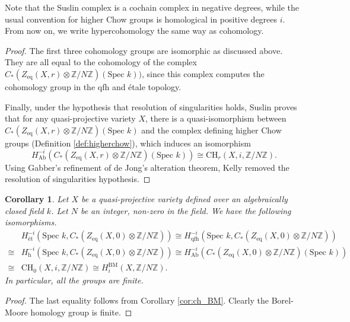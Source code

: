 \documentclass{amsart}
\newtheorem{cor}[theorem]{Corollary}
\theoremstyle{definition}
\theoremstyle{remark}
\newcommand{\mbb}{\mathbb}
\newcommand{\ZZ}{\mbb{Z}}
\newcommand{\SP}{\text{Spec }}
\newcommand{\eq}{\text{eq}}
\begin{document}
Note that the Suslin complex is a cochain complex in negative degrees, while the usual convention for higher Chow groups is homological in positive degrees $i$. 
From now on, we write hypercohomology the same way as cohomology.
\begin{proof}
The first three cohomology groups are isomorphic as discussed above. They are all equal to the cohomology of the complex $C_*(Z_\eq(X, r)\otimes \ZZ/N \ZZ)(\SP k))$, since this complex computes the cohomology group in the qfh and \'etale topology.

Finally,  under the hypothesis that resolution of singularities holds, Suslin \cite[Theorem 3.2]{Suslin_Higher_Chow} proves that for any quasi-projective variety $X$, there is a quasi-isomorphism between 
$C_*(Z_\eq(X, r)\otimes \ZZ/N \ZZ)(\SP k)$ and the complex defining higher Chow groups (Definition \ref{def:higherchow}), which induces
an isomorphism
\[
H^{-i}_\text{Ab}(C_*(Z_\eq(X, r)\otimes \ZZ/N \ZZ)(\SP k))
\cong \text{CH}_{r}(X, i, \ZZ/N \ZZ).
\]
Using Gabber's refinement of de Jong's alteration theorem, Kelly \cite[Theorem 5.6.4]{Kelly} removed the resolution of singularities hypothesis.
\end{proof}


\begin{cor}\label{cor:finiteness}
Let $X$ be a  quasi-projective variety defined over an algebraically closed field $k$. Let $N$ be an integer, non-zero in the field. We have the following isomorphisms. 
\begin{align*}
    &H^{-i}_\text{\'et}(\SP k, C_*(Z_\eq(X, 0)\otimes \ZZ/N \ZZ)) \cong H^{-i}_\text{qfh}(\SP k, C_*(Z_\eq(X, 0)\otimes \ZZ/N \ZZ))\\
\cong &H^{-i}_\text{h}(\SP k, C_*(Z_\eq(X, 0)\otimes \ZZ/N \ZZ)) \cong H^{-i}_\text{Ab}(C_*(Z_\eq(X, 0)\otimes \ZZ/N \ZZ)(\SP k))\\
\cong &\text{CH}_{0}(X, i, \ZZ/N \ZZ) \cong H_{i}^{\text{BM}}(X, \ZZ/N \ZZ).
\end{align*}
In particular, all the groups are finite. 
\end{cor}

\begin{proof}
The last equality follows from Corollary \ref{cor:ch_BM}. Clearly the Borel-Moore homology group is finite.
\end{proof}
\end{document}
